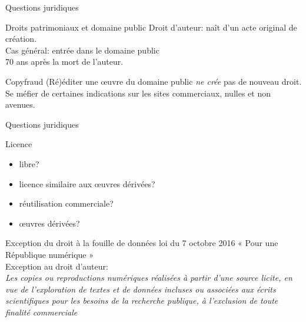 \documentclass[ignorenonframetext]{beamer}
\begin{document}
\begin{frame}{Questions juridiques}


			\begin{block}{Droits patrimoniaux et domaine public}
				Droit d'auteur: naît d'un acte original de création.\\
				Cas général: entrée dans le domaine public \\
				70 ans après la mort de l'auteur.
			\end{block}
			\begin{block}{Copyfraud}
				(Ré)éditer une œuvre du domaine public \textit{ne crée} pas de nouveau droit.\\
				Se méfier de certaines indications sur les sites commerciaux, nulles et non avenues.
			\end{block}
	
\end{frame}

\begin{frame}{Questions juridiques}

		\begin{block}{Licence}
			\begin{itemize}
				\item libre?
				\item licence similaire aux œuvres dérivées?
				\item réutilisation commerciale?
				\item œuvres dérivées?
			\end{itemize}
		\end{block}
		\begin{block}{Exception du droit à la fouille de données}
			loi du 7 octobre 2016 « Pour une République numérique »\\
			Exception au droit d'auteur:\\
			\textit{ Les copies ou reproductions numériques réalisées à partir d'une source licite, en vue de l'exploration de textes et de données incluses ou associées aux écrits scientifiques pour les besoins de la recherche publique, à l'exclusion de toute finalité commerciale}		 
		\end{block}

\end{frame}
\end{document}
